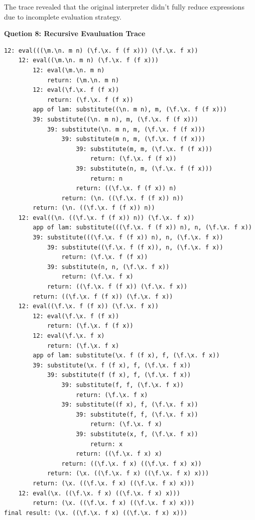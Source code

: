 \documentclass{article}
\theoremstyle{theorem}
\theoremstyle{definition}
\theoremstyle{remark}
\begin{document}
The trace revealed that the original interpreter didn't fully reduce expressions due to incomplete evaluation strategy.

\textbf{Quetion 8: Recursive Evauluation Trace}
\begin{verbatim}
12: eval(((\m.\n. m n) (\f.\x. f (f x))) (\f.\x. f x))
    12: eval((\m.\n. m n) (\f.\x. f (f x)))
        12: eval(\m.\n. m n)
            return: (\m.\n. m n)
        12: eval(\f.\x. f (f x))
            return: (\f.\x. f (f x))
        app of lam: substitute((\n. m n), m, (\f.\x. f (f x)))
        39: substitute((\n. m n), m, (\f.\x. f (f x)))
            39: substitute(\n. m n, m, (\f.\x. f (f x)))
                39: substitute(m n, m, (\f.\x. f (f x)))
                    39: substitute(m, m, (\f.\x. f (f x)))
                        return: (\f.\x. f (f x))
                    39: substitute(n, m, (\f.\x. f (f x)))
                        return: n
                    return: ((\f.\x. f (f x)) n)
                return: (\n. ((\f.\x. f (f x)) n))
        return: (\n. ((\f.\x. f (f x)) n))
    12: eval((\n. ((\f.\x. f (f x)) n)) (\f.\x. f x))
        app of lam: substitute(((\f.\x. f (f x)) n), n, (\f.\x. f x))
        39: substitute(((\f.\x. f (f x)) n), n, (\f.\x. f x))
            39: substitute((\f.\x. f (f x)), n, (\f.\x. f x))
                return: (\f.\x. f (f x))
            39: substitute(n, n, (\f.\x. f x))
                return: (\f.\x. f x)
            return: ((\f.\x. f (f x)) (\f.\x. f x))
        return: ((\f.\x. f (f x)) (\f.\x. f x))
    12: eval((\f.\x. f (f x)) (\f.\x. f x))
        12: eval(\f.\x. f (f x))
            return: (\f.\x. f (f x))
        12: eval(\f.\x. f x)
            return: (\f.\x. f x)
        app of lam: substitute(\x. f (f x), f, (\f.\x. f x))
        39: substitute(\x. f (f x), f, (\f.\x. f x))
            39: substitute(f (f x), f, (\f.\x. f x))
                39: substitute(f, f, (\f.\x. f x))
                    return: (\f.\x. f x)
                39: substitute((f x), f, (\f.\x. f x))
                    39: substitute(f, f, (\f.\x. f x))
                        return: (\f.\x. f x)
                    39: substitute(x, f, (\f.\x. f x))
                        return: x
                    return: ((\f.\x. f x) x)
                return: ((\f.\x. f x) ((\f.\x. f x) x))
            return: (\x. ((\f.\x. f x) ((\f.\x. f x) x)))
        return: (\x. ((\f.\x. f x) ((\f.\x. f x) x)))
    12: eval(\x. ((\f.\x. f x) ((\f.\x. f x) x)))
        return: (\x. ((\f.\x. f x) ((\f.\x. f x) x)))
final result: (\x. ((\f.\x. f x) ((\f.\x. f x) x)))
\end{verbatim}
\end{document}
